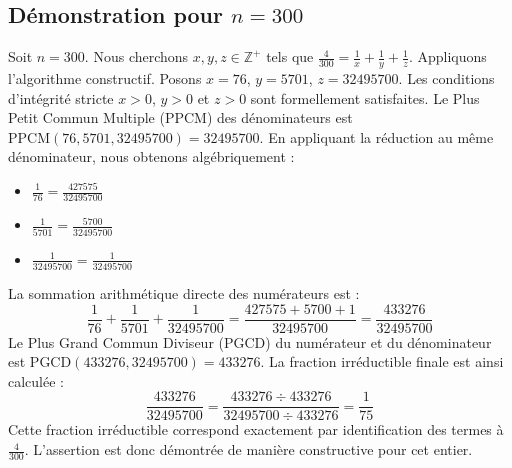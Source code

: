 \documentclass[11pt,a4paper]{article}
\begin{document}
\subsection{Démonstration pour $n = 300$}
Soit $n = 300$. Nous cherchons $x, y, z \in \mathbb{Z}^{+}$ tels que $\frac{4}{300} = \frac{1}{x} + \frac{1}{y} + \frac{1}{z}$.
Appliquons l'algorithme constructif. Posons $x = 76$, $y = 5701$, $z = 32495700$.
Les conditions d'intégrité stricte $x > 0$, $y > 0$ et $z > 0$ sont formellement satisfaites.
Le Plus Petit Commun Multiple (PPCM) des dénominateurs est $\text{PPCM}(76, 5701, 32495700) = 32495700$.
En appliquant la réduction au même dénominateur, nous obtenons algébriquement :
\begin{itemize}
    \item $\frac{1}{76} = \frac{427575}{32495700}$
    \item $\frac{1}{5701} = \frac{5700}{32495700}$
    \item $\frac{1}{32495700} = \frac{1}{32495700}$
\end{itemize}
La sommation arithmétique directe des numérateurs est :
$$ \frac{1}{76} + \frac{1}{5701} + \frac{1}{32495700} = \frac{427575 + 5700 + 1}{32495700} = \frac{433276}{32495700} $$
Le Plus Grand Commun Diviseur (PGCD) du numérateur et du dénominateur est $\text{PGCD}(433276, 32495700) = 433276$.
La fraction irréductible finale est ainsi calculée :
$$ \frac{433276}{32495700} = \frac{433276 \div 433276}{32495700 \div 433276} = \frac{1}{75} $$
Cette fraction irréductible correspond exactement par identification des termes à $\frac{4}{300}$. L'assertion est donc démontrée de manière constructive pour cet entier.
\end{document}
